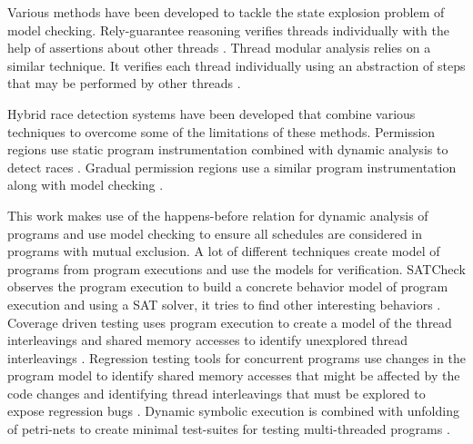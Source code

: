 Various methods have been developed to tackle the state explosion problem of model checking. Rely-guarantee reasoning verifies threads individually with the help of assertions about other threads \cite{xu1997rely, popeea2012compositional}. Thread modular analysis relies on a similar technique. It verifies each thread individually using an abstraction of steps that may be performed by other threads \cite{flanagan2003thread, malkis2007precise, henzinger2003thread, gotsman2007thread}.

Hybrid race detection systems have been developed that combine various techniques to overcome some of the limitations of these methods. Permission regions use static program instrumentation combined with dynamic analysis to detect races \cite{westbrook2012practical, westbrook2012permission}. Gradual permission regions use a similar program instrumentation along with model checking \cite{mercer2015model}. 

This work makes use of the happens-before relation for dynamic analysis of programs and use model checking to ensure all schedules are considered in programs with mutual exclusion. A lot of different techniques create model of programs from program executions and use the models for verification. SATCheck observes the program execution to build a concrete behavior model of program execution and using a SAT solver, it tries to find other interesting behaviors \cite{demsky2015satcheck}. Coverage driven testing uses program execution to create a model of the thread interleavings and shared memory accesses to identify unexplored thread interleavings \cite{hong2012testing, yu2012maple}. Regression testing tools for concurrent programs use changes in the program model to identify shared memory accesses that might be affected by the code changes and identifying thread interleavings that must be explored to expose regression bugs \cite{terragni2015recontest, yu2014simrt}. Dynamic symbolic execution is combined with unfolding of petri-nets to create minimal test-suites for testing multi-threaded programs \cite{leon2015unfolding, kahkonen2015unfolding}.
